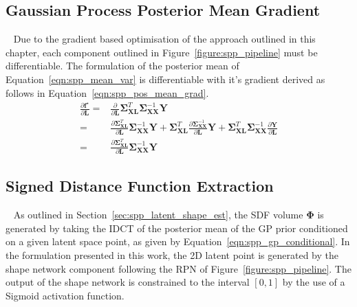 \subsection{Gaussian Process Posterior Mean Gradient}
~\label{subsec:gp_posterior_mean_grad}
Due to the gradient based optimisation of the approach outlined in this chapter, each 
component outlined in Figure~\ref{figure:spp_pipeline} must be differentiable. The formulation 
of the posterior mean of Equation~\ref{eqn:spp_mean_var} is differentiable with it's gradient 
derived as follows in Equation~\ref{eqn:spp_pos_mean_grad}.
\begin{align}
  \label{eqn:spp_pos_mean_grad}
  \frac{\partial \bm{f}^{\star}}{\partial \bm{L}} ={}&
  \frac{\partial}{\partial \bm{L}}
  \bm{\Sigma}_{\bm{XL}}^{T} \bm{\Sigma}_{\bm{XX}}^{-1} \bm{Y}\\
  ={}& \frac{\partial \bm{\Sigma}_{\bm{XL}}^{T}}{\partial \bm{L}}
  \bm{\Sigma}_{\bm{XX}}^{-1} \bm{Y}
  + \bm{\Sigma}_{\bm{XL}}^{T} 
  \frac{\partial\bm{\Sigma}_{\bm{XX}}^{-1}}{\partial \bm{L}} \bm{Y}
  + \bm{\Sigma}_{\bm{XL}}^{T} \bm{\Sigma}_{\bm{XX}}^{-1} 
  \frac{\partial \bm{Y}}{\partial \bm{L}}\\
  ={}& \frac{\partial \bm{\Sigma}_{\bm{XL}}^{T}}{\partial \bm{L}}
  \bm{\Sigma}_{\bm{XX}}^{-1} \bm{Y}
\end{align}

\subsection{Signed Distance Function Extraction}
~\label{subsec:sdf_extraction}
As outlined in Section~\ref{sec:spp_latent_shape_est}, the SDF volume \( \bm{\Phi} \) 
is generated by taking the IDCT of the posterior mean of the GP prior conditioned on 
a given latent space point, as given by Equation~\ref{eqn:spp_gp_conditional}. In the 
formulation presented in this work, the 2D latent point is generated by the shape 
network component following the RPN of Figure~\ref{figure:spp_pipeline}. 
The output of the shape network is constrained to the interval \( [0, 1] \) by the use 
of a Sigmoid activation function.%

